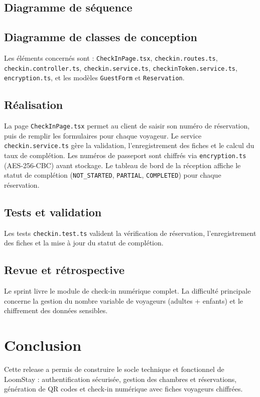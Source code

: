
\subsection{Diagramme de séquence}

\subsection{Diagramme de classes de conception}
Les éléments concernés sont : \texttt{CheckInPage.tsx}, \texttt{checkin.routes.ts}, \texttt{checkin.controller.ts}, \texttt{checkin.service.ts}, \texttt{checkinToken.service.ts}, \texttt{encryption.ts}, et les modèles \texttt{GuestForm} et \texttt{Reservation}.


\subsection{Réalisation}
La page \texttt{CheckInPage.tsx} permet au client de saisir son numéro de réservation, puis de remplir les formulaires pour chaque voyageur. Le service \texttt{checkin.service.ts} gère la validation, l'enregistrement des fiches et le calcul du taux de complétion. Les numéros de passeport sont chiffrés via \texttt{encryption.ts} (AES-256-CBC) avant stockage. Le tableau de bord de la réception affiche le statut de complétion (\texttt{NOT\_STARTED}, \texttt{PARTIAL}, \texttt{COMPLETED}) pour chaque réservation.


\subsection{Tests et validation}
Les tests \texttt{checkin.test.ts} valident la vérification de réservation, l'enregistrement des fiches et la mise à jour du statut de complétion.

\subsection{Revue et rétrospective}
Le sprint livre le module de check-in numérique complet. La difficulté principale concerne la gestion du nombre variable de voyageurs (adultes + enfants) et le chiffrement des données sensibles.

\section*{Conclusion}
Cette release a permis de construire le socle technique et fonctionnel de LoomStay : authentification sécurisée, gestion des chambres et réservations, génération de QR codes et check-in numérique avec fiches voyageurs chiffrées.

